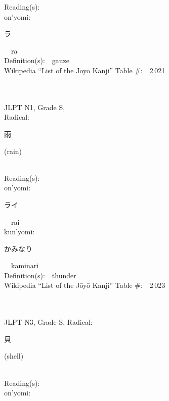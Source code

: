 \begin{multicols}{2}
Reading(s):\ \ \\
{\hspace*{1em}}on'yomi:\ \ \\
{\hspace*{2em}}{\begin{CJK}{UTF8}{min} ラ \end{CJK}}\ \ ra\ \ \\
Definition(s):\ \ gauze \\
Wikipedia ``List of the J\=oy\=o Kanji'' Table \#:\ \ 2\,021 \\
\ \ \\
{\fontsize{34pt}{40pt}  }\ \ \\
{JLPT N1, Grade S, \\Radical:\ \ {\begin{CJK}{UTF8}{min} 雨 \end{CJK}} (rain) } \\
Reading(s):\ \ \\
{\hspace*{1em}}on'yomi:\ \ \\
{\hspace*{2em}}{\begin{CJK}{UTF8}{min} ライ \end{CJK}}\ \ rai\ \ \\
{\hspace*{1em}}kun'yomi:\ \ \\
{\hspace*{2em}}{\begin{CJK}{UTF8}{min} かみなり \end{CJK}}\ \ kaminari\ \ \\
Definition(s):\ \ thunder \\
Wikipedia ``List of the J\=oy\=o Kanji'' Table \#:\ \ 2\,023 \\
\ \ \\
{\fontsize{34pt}{40pt}  }\ \ \\  %
{JLPT N3, Grade S, Radical:\ \ {\begin{CJK}{UTF8}{min} 貝 \end{CJK}} (shell) } \\
Reading(s):\ \ \\
{\hspace*{1em}}on'yomi:\ \ \\

\end{multicols}
